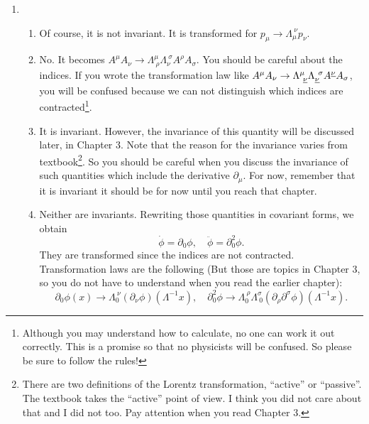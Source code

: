 \documentclass[a4paper,pdftex]{article}
\begin{document}
\begin{enumerate}

   \item 
   \begin{enumerate}

      \item 
      Of course, it is not invariant. It is transformed for $p_{\mu}\rightarrow\Lambda_{\mu}^{\ \nu}p_{\nu}$. 

      \item 
      No. It becomes $A^{\mu}A_{\nu}\rightarrow\Lambda^{\mu}_{\ \rho}\Lambda_{\nu}^{\ \sigma}A^{\rho}A_{\sigma}$. You should be careful about the indices. If you wrote the transformation law like $A^{\mu}A_{\nu}\rightarrow\Lambda^{\mu}_{\ \uline{\nu}}\Lambda_{\uline{\nu}}^{\ \sigma}A^{\uline{\nu}}A_{\sigma}$, you will be confused because we can not distinguish which indices are contracted\footnote{
         Although you may understand how to calculate, no one can work it out correctly. This is a promise so that no physicists will be confused. So please be sure to follow the rules!
      }.

      \item 
      It is invariant. However, the invariance of this quantity will be discussed later, in Chapter 3. Note that the reason for the invariance varies from textbook\footnote{
         There are two definitions of the Lorentz transformation, ``active'' or ``passive''. The textbook takes the ``active'' point of view. I think you did not care about that and I did not too. Pay attention when you read Chapter 3.
      }. So you should be careful when you discuss the invariance of such quantities which include the derivative $\partial_{\mu}$. For now, remember that it is invariant it should be for now until you reach that chapter.

      \item 
      Neither are invariants. Rewriting those quantities in covariant forms, we obtain
      \begin{equation}
         \dot{\phi}
         =
         \partial_{0}\phi
         ,\quad
         \ddot{\phi}
         =
         \partial_{0}^2\phi         
         .
      \end{equation}
      They are transformed since the indices are not contracted. Transformation laws are the following (But those are topics in Chapter 3, so you do not have to understand when you read the earlier chapter):
      \begin{equation}
         \partial_{0}\phi(x)
         \rightarrow
         \Lambda_{0}^{\ \nu}(\partial_{\nu}\phi)(\Lambda^{-1}x)
         ,\quad
         \partial_{0}^2\phi     
         \rightarrow
         \Lambda_{0}^{\ \rho}\Lambda^{\sigma}_{\ 0}
         (\partial_{\rho}\partial^{\sigma}\phi)(\Lambda^{-1}x)
         .
      \end{equation}


\end{enumerate}
\end{enumerate}
\end{document}
